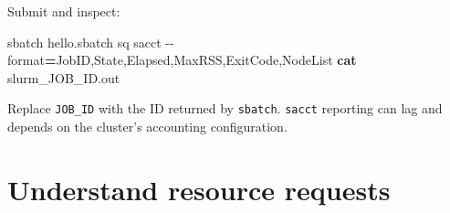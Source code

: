 \documentclass[
]{book}
\newenvironment{Shaded}{\begin{snugshade}}{\end{snugshade}}
\newcommand{\AttributeTok}[1]{\textcolor[rgb]{0.13,0.29,0.53}{#1}}
\newcommand{\BuiltInTok}[1]{#1}
\newcommand{\CommentTok}[1]{\textcolor[rgb]{0.56,0.35,0.01}{\textit{#1}}}
\newcommand{\ExtensionTok}[1]{#1}
\newcommand{\FunctionTok}[1]{\textcolor[rgb]{0.13,0.29,0.53}{\textbf{#1}}}
\newcommand{\NormalTok}[1]{#1}
\newcommand{\OperatorTok}[1]{\textcolor[rgb]{0.81,0.36,0.00}{\textbf{#1}}}
\newcommand{\StringTok}[1]{\textcolor[rgb]{0.31,0.60,0.02}{#1}}
\newcommand{\VariableTok}[1]{\textcolor[rgb]{0.00,0.00,0.00}{#1}}
\begin{document}
\begin{Shaded}
\end{Shaded}

Submit and inspect:

\begin{Shaded}
\begin{Highlighting}[]
\ExtensionTok{sbatch}\NormalTok{ hello.sbatch}
\ExtensionTok{sq}
\ExtensionTok{sacct} \AttributeTok{{-}{-}format}\OperatorTok{=}\NormalTok{JobID,State,Elapsed,MaxRSS,ExitCode,NodeList}
\FunctionTok{cat}\NormalTok{ slurm\_JOB\_ID.out}
\end{Highlighting}
\end{Shaded}

Replace \texttt{JOB\_ID} with the ID returned by \texttt{sbatch}. \texttt{sacct} reporting can lag and depends on the cluster's accounting configuration.

\section{Understand resource requests}\label{understand-resource-requests}
\end{document}
